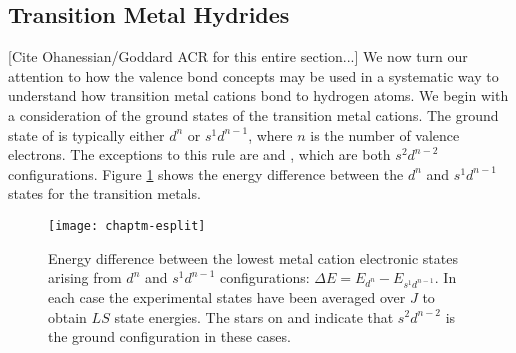 \subsection{Transition Metal Hydrides}
[Cite Ohanessian/Goddard ACR for this entire section...] We now turn
our attention to how the valence bond concepts may be used in a
systematic way to understand how transition metal cations bond to
hydrogen atoms. We begin with a consideration of the ground states of
the transition metal cations. The ground state of  is
typically either $d^n$ or $s^1d^{n-1}$, where $n$ is the number of
valence electrons. The exceptions to this rule are  and
, which are both $s^2d^{n-2}$ configurations. Figure
\ref{chaptm-esplit} shows the energy difference between the $d^n$ and
$s^1d^{n-1}$ states for the transition metals.

\begin{figure}
\begin{center}
\texttt{[image: chaptm-esplit]}
\end{center}
\caption{Energy difference between the lowest metal cation electronic
states arising from $d^n$ and $s^1d^{n-1}$ configurations: $\Delta E =
E_{d^n} - E_{s^1d^{n-1}}$. In each case the experimental states have
been averaged over $J$ to obtain $LS$ state energies. The stars on
 and  indicate that $s^2d^{n-2}$ is the ground
configuration in these cases.}
\label{chaptm-esplit}
\end{figure}

